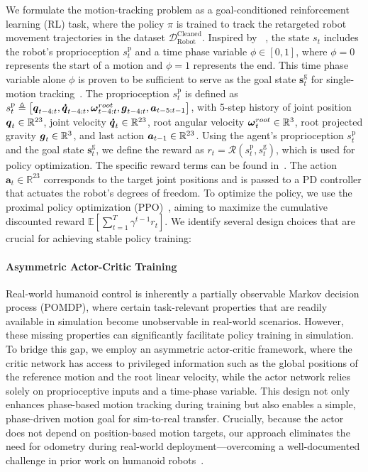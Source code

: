 We formulate the motion-tracking problem as a goal-conditioned reinforcement learning (RL) task, where the policy $\pi$ is trained to track the retargeted robot movement trajectories in the dataset ${\mathcal{D}}_{\text{Robot}}^{\text{Cleaned}}$. Inspired by ~\cite{peng2018deepmimic}, the state $s_t$ includes the robot’s proprioception $s_t^{\mathrm{p}}$ and a time phase variable $\phi \in [0,1]$, where $\phi=0$ represents the start of a motion and $\phi=1$ represents the end. This time phase variable alone $\phi$ is proven to be sufficient to serve as the goal state $\boldsymbol{s}_t^{\mathrm{g}}$ for single-motion tracking~\cite{peng2018deepmimic}. 
The proprioception $s_t^{\mathrm{p}}$ is defined as $s_t^{\mathrm{p}} \triangleq \left[{\boldsymbol{{q}}_{t-4:t}}, {\boldsymbol{\dot{q}}_{t-4:t}},  {\boldsymbol{\omega}^{root}_{t-4:t}}, {\boldsymbol{g}_{t-4:t}}, {\boldsymbol{a}_{t-5:t-1}} \right]$, with 5-step history of joint position ${\boldsymbol{{q}}_{t}}\in\mathbb{R}^{23}$, joint velocity ${\boldsymbol{\dot{q}}_{t}}\in\mathbb{R}^{23}$, root angular velocity ${\boldsymbol{\omega}^{root}_{t}}\in\mathbb{R}^3$, root projected gravity ${\boldsymbol{g}_{t}}\in\mathbb{R}^3$, and last action ${\boldsymbol{a}_{t-1}}\in\mathbb{R}^{23}$.
Using the agent’s proprioception $s_t^{\mathrm{p}}$ and the goal state $\boldsymbol{s}_t^{\mathrm{g}}$, we define the reward as  $r_t=\mathcal{R}\left(s_t^{\mathrm{p}}, s_t^{\mathrm{g}}\right)$, which is used for policy optimization.  The specific reward terms can be found in~. The action $\boldsymbol{a}_t \in \mathbb{R}^{23}$ corresponds to the target joint positions and is passed to a PD controller that actuates the robot’s degrees of freedom. To optimize the policy, we use the proximal policy optimization (PPO)~\cite{schulman2017proximal}, aiming to maximize the cumulative discounted reward $\mathbb{E}\left[\sum_{t=1}^T \gamma^{t-1} r_t\right]$. We identify several design choices that are crucial for achieving stable policy training:

\paragraph{Asymmetric Actor-Critic Training}

Real-world humanoid control is inherently a partially observable Markov decision process (POMDP), where certain task-relevant properties that are readily available in simulation become unobservable in real-world scenarios. However, these missing properties can significantly facilitate policy training in simulation. To bridge this gap, we employ an asymmetric actor-critic framework, where the critic network has access to privileged information such as the global positions of the reference motion and the root linear velocity, while the actor network relies solely on proprioceptive inputs and a time-phase variable. This design not only enhances phase-based motion tracking during training but also enables a simple, phase-driven motion goal for sim-to-real transfer. Crucially, because the actor does not depend on position-based motion targets, our approach eliminates the need for odometry during real-world deployment—overcoming a well-documented challenge in prior work on humanoid robots~\cite{he2024learning,he2024omnih2o}.

